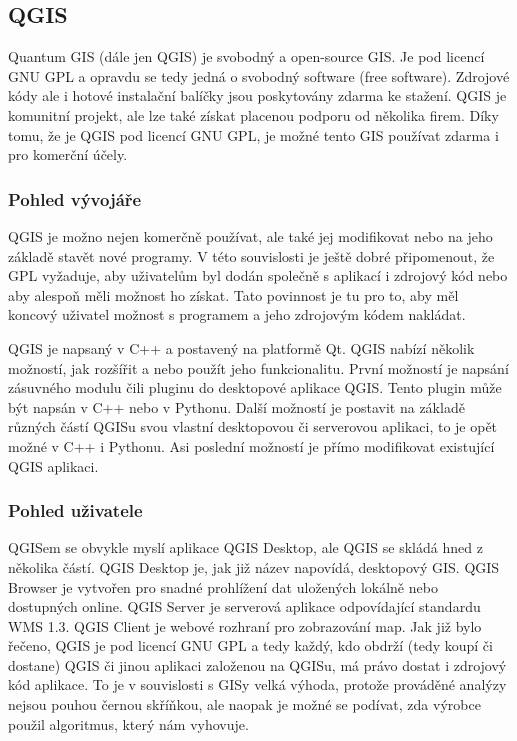 \documentclass[a4paper,10pt]{article}
\begin{document}
\subsection{QGIS}
Quantum GIS (dále jen QGIS) je svobodný a open-source GIS.
Je pod licencí GNU GPL a opravdu se tedy jedná o svobodný software (free software).
Zdrojové kódy ale i hotové instalační balíčky jsou poskytovány zdarma ke stažení.
QGIS je komunitní projekt, ale lze také získat placenou podporu od několika firem.
Díky tomu, že je QGIS pod licencí GNU GPL, je možné tento GIS používat zdarma i pro komerční účely.

\subsubsection{Pohled vývojáře}

QGIS je možno nejen komerčně používat, ale také jej modifikovat nebo na jeho základě stavět nové programy.
V této souvislosti je ještě dobré připomenout, že GPL vyžaduje, aby uživatelům byl dodán společně s aplikací i zdrojový kód nebo aby alespoň měli možnost ho získat.
Tato povinnost je tu pro to, aby měl koncový uživatel možnost s programem a jeho zdrojovým kódem nakládat.

QGIS je napsaný v C++ a postavený na platformě Qt.
QGIS nabízí několik možností, jak rozšířit a nebo použít jeho funkcionalitu.
První možností je napsání zásuvného modulu čili pluginu do desktopové aplikace QGIS.
Tento plugin může být napsán v C++ nebo v Pythonu.
Další možností je postavit na základě různých částí QGISu svou vlastní desktopovou či serverovou aplikaci, to je opět možné v C++ i Pythonu.
Asi poslední možností je přímo modifikovat existující QGIS aplikaci.

\subsubsection{Pohled uživatele}

QGISem se obvykle myslí aplikace QGIS Desktop, ale QGIS se skládá hned z několika částí.
QGIS Desktop je, jak již název napovídá, desktopový GIS.
QGIS Browser je vytvořen pro snadné prohlížení dat uložených lokálně nebo dostupných online.
QGIS Server je serverová aplikace odpovídající standardu WMS 1.3.
QGIS Client je webové rozhraní pro zobrazování map.
Jak již bylo řečeno, QGIS je pod licencí GNU GPL a tedy každý, kdo obdrží (tedy koupí či dostane) QGIS či jinou aplikaci založenou na QGISu, má právo dostat i zdrojový kód aplikace.
To je v souvislosti s GISy velká výhoda, protože prováděné analýzy nejsou pouhou černou skříňkou,
ale naopak je možné se podívat, zda výrobce použil algoritmus, který nám vyhovuje.
\end{document}
